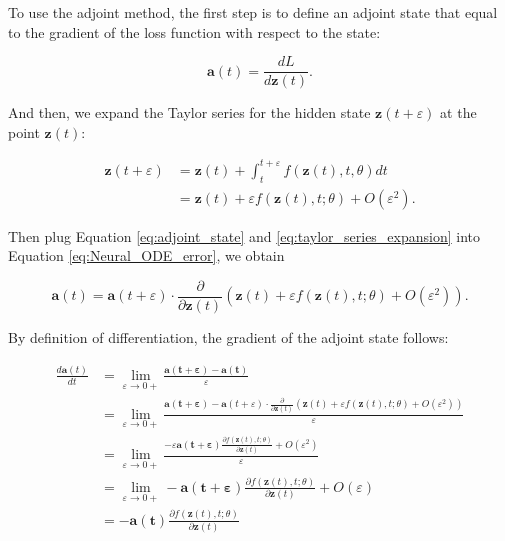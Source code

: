 \documentclass[
	parskip, 			   %
	twoside, 			   %
	DIV=14, 			   %
	BCOR=15.0mm, 		   %
	headsepline, 		   %
	open=right, 		   %
	captions=tableheading, %
	bibliography=totoc,    %
	numbers=noenddot       %
]{scrreprt}
\begin{document}
To use the adjoint method, the first step is to define an adjoint state that equal to the gradient of the loss function with respect to the state:

\begin{equation}
    \label{eq:adjoint_state}
    \mathbf{a}(t) = \frac{d L}{d\mathbf{z}(t)}.
\end{equation}

And then, we expand the Taylor series for the hidden state $\mathbf{z}(t+\varepsilon )$ at the point $\mathbf{z}(t)$:

\begin{equation}
    \label{eq:taylor_series_expansion}
    \begin{aligned}
    \mathbf{z}(t+\varepsilon ) &= \mathbf{z}(t) + \int_{t}^{t+\varepsilon } f(\mathbf{z}(t), t, \theta)dt\\
    &= \mathbf{z}(t) + \varepsilon f(\mathbf{z}(t), t; \theta) + O (\varepsilon ^2).
    \end{aligned}
\end{equation}

Then plug Equation \ref{eq:adjoint_state} and \ref{eq:taylor_series_expansion} into Equation \ref{eq:Neural_ODE_error}, we obtain

\begin{equation}
    \label{eq:Neural_ODE_adjoint_state}
    \mathbf{a}(t) = \mathbf{a}(t+\varepsilon ) \cdot \frac{\partial}{\partial \mathbf{z}(t)} (\mathbf{z}(t) + \varepsilon f(\mathbf{z}(t), t; \theta) + O (\varepsilon ^2)) .
\end{equation}

By definition of differentiation, the gradient of the adjoint state follows:

\begin{equation}
    \label{eq:adjoint_state_gradient_hidden_state}
    \begin{aligned}
        \frac{d\mathbf{a}(t)}{dt} &= \lim_{\varepsilon \to 0+} \frac{\mathbf{a(t+\varepsilon)}-\mathbf{a(t)}}{\varepsilon} \\
        &= \lim_{\varepsilon \to 0+} \frac{\mathbf{a(t+\varepsilon)}-\mathbf{a}(t+\varepsilon ) \cdot \frac{\partial}{\partial \mathbf{z}(t)} (\mathbf{z}(t) + \varepsilon f(\mathbf{z}(t), t; \theta) + O (\varepsilon ^2)) }{\varepsilon}\\
        &= \lim_{\varepsilon \to 0+} \frac{-\varepsilon \mathbf{a(t+\varepsilon)} \frac{\partial f(\mathbf{z}(t), t; \theta)}{\partial \mathbf{z}(t)} + O (\varepsilon ^2)}{\varepsilon}\\
        &= \lim_{\varepsilon \to 0+} - \mathbf{a(t+\varepsilon)} \frac{\partial f(\mathbf{z}(t), t; \theta)}{\partial \mathbf{z}(t)} + O (\varepsilon)\\
        &= - \mathbf{a(t)} \frac{\partial f(\mathbf{z}(t), t; \theta)}{\partial \mathbf{z}(t)}
    \end{aligned}
\end{equation}
\end{document}

